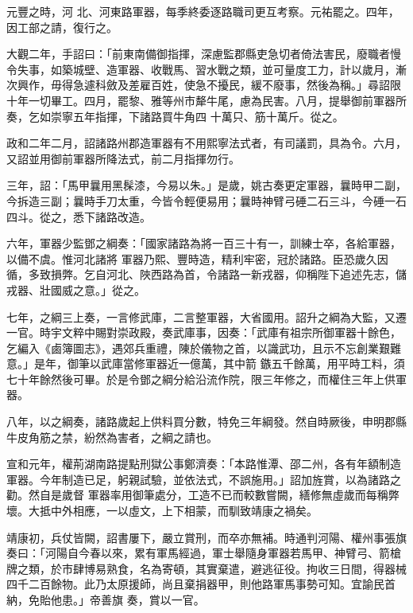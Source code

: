 \begin{pinyinscope}
 元豐之時，河
 北、河東路軍器，每季終委逐路職司更互考察。元祐罷之。四年，因工部之請，復行之。



 大觀二年，手詔曰：「前東南備御指揮，深慮監郡縣吏急切者倚法害民，廢職者慢令失事，如築城壁、造軍器、收戰馬、習水戰之類，並可量度工力，計以歲月，漸次興作，毋得急遽科斂及差雇百姓，使急不擾民，緩不廢事，然後為稱。」尋詔限十年一切畢工。四月，罷黎、雅等州市犛牛尾，慮為民害。八月，提舉御前軍器所奏，乞如崇寧五年指揮，下諸路買牛角四
 十萬只、筋十萬斤。從之。



 政和二年二月，詔諸路州郡造軍器有不用熙寧法式者，有司議罰，具為令。六月，又詔並用御前軍器所降法式，前二月指揮勿行。



 三年，詔：「馬甲曩用黑髹漆，今易以朱。」是歲，姚古奏更定軍器，曩時甲二副，今拆造三副；曩時手刀太重，今皆令輕便易用；曩時神臂弓硾二石三斗，今硾一石四斗。從之，悉下諸路改造。



 六年，軍器少監鄧之綱奏：「國家諸路為將一百三十有一，訓練士卒，各給軍器，以備不虞。惟河北諸將
 軍器乃熙、豐時造，精利牢密，冠於諸路。臣恐歲久因循，多致損弊。乞自河北、陜西路為首，令諸路一新戎器，仰稱陛下追述先志，儲戎器、壯國威之意。」從之。



 七年，之綱三上奏，一言修武庫，二言整軍器，大省國用。詔升之綱為大監，又遷一官。時宇文粹中賜對崇政殿，奏武庫事，因奏：「武庫有祖宗所御軍器十餘色，乞編入《鹵簿圖志》，遇郊兵重禮，陳於儀物之首，以識武功，且示不忘創業艱難意。」是年，御筆以武庫當修軍器近一億萬，其中箭
 鏃五千餘萬，用平時工料，須七十年餘然後可畢。於是令鄧之綱分給沿流作院，限三年修之，而權住三年上供軍器。



 八年，以之綱奏，諸路歲起上供料買分數，特免三年綱發。然自時厥後，申明郡縣牛皮角筋之禁，紛然為害者，之綱之請也。



 宣和元年，權荊湖南路提點刑獄公事鄭濟奏：「本路惟潭、邵二州，各有年額制造軍器。今年制造已足，躬親試驗，並依法式，不誤施用。」詔加旌賞，以為諸路之勸。然自是歲督
 軍器率用御筆處分，工造不已而較數嘗闕，繕修無虛歲而每稱弊壞。大抵中外相應，一以虛文，上下相蒙，而馴致靖康之禍矣。



 靖康初，兵仗皆闕，詔書屢下，嚴立賞刑，而卒亦無補。時通判河陽、權州事張旗奏曰：「河陽自今春以來，累有軍馬經過，軍士舉隨身軍器若馬甲、神臂弓、箭槍牌之類，於市肆博易熟食，名為寄頓，其實棄遣，避逃征役。拘收三日間，得器械四千二百餘物。此乃太原援師，尚且棄捐器甲，則他路軍馬事勢可知。宜諭民首納，免貽他患。」帝善旗
 奏，賞以一官。




\end{pinyinscope}
